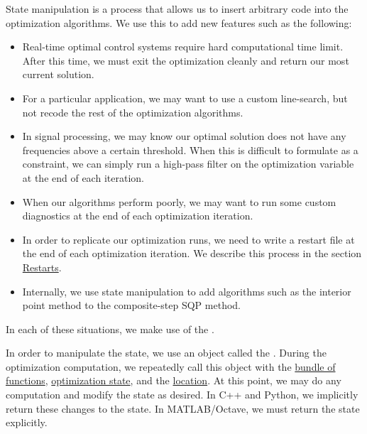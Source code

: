 \documentclass{report}
\makeatletter
\DeclareRobustCommand*{\textct}[1]{%
  \begingroup\@activeus\scantokens{\texttt{#1}\endinput}\endgroup}
\newcommand{\textctref}[1]{\hyperref[itm:#1]{\textct{#1}}}
\newcommand{\secrestart}{Restarts}
\makeatother
\begin{document}
        State manipulation is a process that allows us to insert arbitrary code into the optimization algorithms.  We use this to add new features such as the following:
\begin{itemize}
    \item Real-time optimal control systems require hard computational time limit.  After this time, we must exit the optimization cleanly and return our most current solution.
    \item For a particular application, we may want to use a custom line-search, but not recode the rest of the optimization algorithms.
    \item In signal processing, we may know our optimal solution does not have any frequencies above a certain threshold.  When this is difficult to formulate as a constraint, we can simply run a high-pass filter on the optimization variable at the end of each iteration.
    \item When our algorithms perform poorly, we may want to run some custom diagnostics at the end of each optimization iteration.
    \item In order to replicate our optimization runs, we need to write a restart file at the end of each optimization iteration.  We describe this process in the section \hyperref[sec:restart]{\secrestart}.
    \item Internally, we use state manipulation to add algorithms such as the interior point method to the composite-step SQP method.
\end{itemize}
\noindent In each of these situations, we make use of the \textctref{StateManipulator}.

        In order to manipulate the state, we use an object called the \textctref{StateManipulator}.  During the optimization computation, we repeatedly call this object with the \hyperref[sec:fns]{bundle of functions}, \hyperref[sec:state]{optimization state}, and the \hyperref[itm:OptimizationLocation]{location}.  At this point, we may do any computation and modify the state as desired.  In C++ and Python, we implicitly return these changes to the state.  In MATLAB/Octave, we must return the state explicitly.
\end{document}

